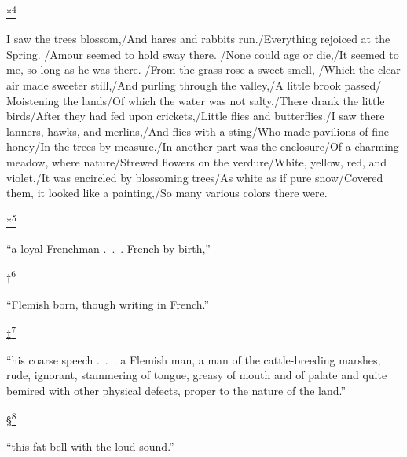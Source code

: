 \protect\hypertarget{23_NOTES.xhtmlux5cux23id_2712}{\protect\hyperlink{21_Chapter_Thirteen__IMAGE_AND_WORD.xhtmlux5cux23id_2711}{*\textsuperscript{4}}}
I saw the trees blossom,/And hares and rabbits run./Everything rejoiced
at the Spring. /Amour seemed to hold sway there. /None could age or
die,/It seemed to me, so long as he was there. /From the grass rose a
sweet smell, /Which the clear air made sweeter still,/And purling
through the valley,/A little brook passed/ Moistening the lands/Of which
the water was not salty./There drank the little birds/After they had fed
upon crickets,/Little flies and butterflies./I saw there lanners, hawks,
and merlins,/And flies with a sting/Who made pavilions of fine honey/In
the trees by measure./In another part was the enclosure/Of a charming
meadow, where nature/Strewed flowers on the verdure/White, yellow, red,
and violet./It was encircled by blossoming trees/As white as if pure
snow/Covered them, it looked like a painting,/So many various colors
there were.

\protect\hypertarget{23_NOTES.xhtmlux5cux23id_2356}{\protect\hyperlink{21_Chapter_Thirteen__IMAGE_AND_WORD.xhtmlux5cux23id_2355}{*\textsuperscript{5}}}
``a loyal Frenchman .~.~. French by birth,''

\protect\hypertarget{23_NOTES.xhtmlux5cux23id_2358}{\protect\hyperlink{21_Chapter_Thirteen__IMAGE_AND_WORD.xhtmlux5cux23id_2357}{†\textsuperscript{6}}}
``Flemish born, though writing in French.''

\protect\hypertarget{23_NOTES.xhtmlux5cux23id_2360}{\protect\hyperlink{21_Chapter_Thirteen__IMAGE_AND_WORD.xhtmlux5cux23id_2359}{‡\textsuperscript{7}}}
``his coarse speech .~.~. a Flemish man, a man of the cattle-breeding
marshes, rude, ignorant, stammering of tongue, greasy of mouth and of
palate and quite bemired with other physical defects, proper to the
nature of the land.''

\protect\hypertarget{23_NOTES.xhtmlux5cux23id_2362}{\protect\hyperlink{21_Chapter_Thirteen__IMAGE_AND_WORD.xhtmlux5cux23id_2361}{§\textsuperscript{8}}}
``this fat bell with the loud sound.''


